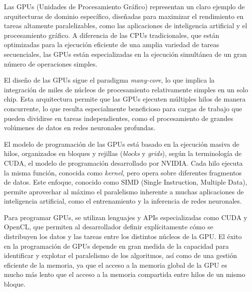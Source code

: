 \documentclass[11pt,spanish,listoffigures,listoftables]{tfgetsinf}
\begin{document}
Las GPUs (Unidades de Procesamiento Gráfico) representan un claro ejemplo de arquitecturas de dominio específico, diseñadas para maximizar el rendimiento en tareas altamente paralelizables, como las aplicaciones de inteligencia artificial y el procesamiento gráfico. A diferencia de las CPUs tradicionales, que están optimizadas para la ejecución eficiente de una amplia variedad de tareas secuenciales, las GPUs están especializadas en la ejecución simultánea de un gran número de operaciones simples. 

El diseño de las GPUs sigue el paradigma \textit{many-core}, lo que implica la integración de miles de núcleos de procesamiento relativamente simples en un solo chip. Esta arquitectura permite que las GPUs ejecuten múltiples hilos de manera concurrente, lo que resulta especialmente beneficioso para cargas de trabajo que pueden dividirse en tareas independientes, como el procesamiento de grandes volúmenes de datos en redes neuronales profundas.

El modelo de programación de las GPUs está basado en la ejecución masiva de hilos, organizados en bloques y rejillas (\textit{blocks} y \textit{grids}), según la terminología de CUDA, el modelo de programación desarrollado por NVIDIA. Cada hilo ejecuta la misma función, conocida como \textit{kernel}, pero opera sobre diferentes fragmentos de datos. Este enfoque, conocido como SIMD (Single Instruction, Multiple Data), permite aprovechar al máximo el paralelismo inherente a muchas aplicaciones de inteligencia artificial, como el entrenamiento y la inferencia de redes neuronales.

Para programar GPUs, se utilizan lenguajes y APIs especializadas como CUDA y OpenCL, que permiten al desarrollador definir explícitamente cómo se distribuyen los datos y las tareas entre los distintos núcleos de la GPU. El éxito en la programación de GPUs depende en gran medida de la capacidad para identificar y explotar el paralelismo de los algoritmos, así como de una gestión eficiente de la memoria, ya que el acceso a la memoria global de la GPU es mucho más lento que el acceso a la memoria compartida entre hilos de un mismo bloque.
\end{document}
